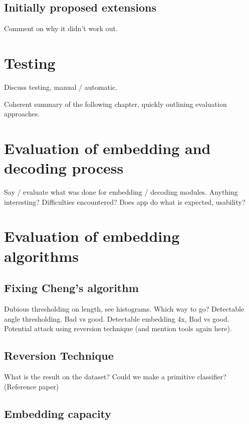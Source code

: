 \documentclass[12pt,british,twoside,notitlepage,usenames,dvipsnames,hypens,final]{report}
\numberwithin{equation}{section}
\numberwithin{figure}{section}
\begin{document}
\subsection{Initially proposed extensions}
Comment on why it didn't work out.


\section{Testing}

Discuss testing, manual / automatic.


Coherent summary of the following chapter, quickly outlining evaluation approaches.

\section{Evaluation of embedding and decoding process}

Say / evaluate what was done for embedding / decoding modules. Anything interesting? Difficulties encountered? Does app do what is expected, usability?

\section{Evaluation of embedding algorithms}

\subsection{Fixing Cheng's algorithm}

Dubious thresholding on length, see histograms. Which way to go?
Detectable angle thresholding. Bad vs good.
Detectable embedding 4x, Bad vs good.
Potential attack using reversion technique (and mention tools again here).

\subsection{Reversion Technique}

What is the result on the dataset? Could we make a primitive classifier? (Reference paper)

\subsection{Embedding capacity}
\end{document}
